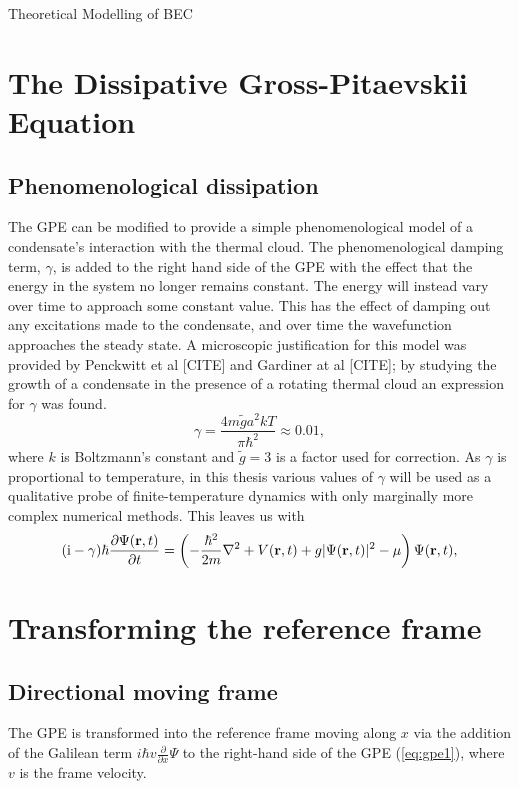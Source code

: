 \begin{chapter}{\label{cha:theoretical_model}Theoretical Modelling of BEC}
\section{\label{section:dgpe} The Dissipative Gross-Pitaevskii Equation}
	\subsection{\label{section:gamma} Phenomenological dissipation}
	The GPE can be modified to provide a simple phenomenological model of a condensate's interaction with the thermal cloud. The phenomenological damping term, $\gamma$, is added to the right hand side of the GPE with the effect that the energy in the system no longer remains constant. The energy will instead vary over time to approach some constant value. This has the effect of damping out any excitations made to the condensate, and over time the wavefunction approaches the steady state. A microscopic justification for this model was provided by Penckwitt et al [CITE] and Gardiner at al [CITE]; by studying the growth of a condensate in the presence of a rotating thermal cloud an expression for $\gamma$ was found.
		\begin{equation}\label{eq:dissgamma}
		\gamma = \frac{4m\tilde{g}a^2kT}{\pi\hbar^2} \approx 0.01,
		\end{equation}
	where $k$ is Boltzmann's constant and $\tilde{g} = 3$ is a factor used for correction. As $\gamma$ is proportional to temperature, in this thesis various values of $\gamma$ will be used as a qualitative probe of finite-temperature dynamics with only marginally more complex numerical methods. This leaves us with
		\begin{equation}\label{eq:dissgpe}
		(\mathrm{i}-\gamma) \hbar \frac{\partial\Psi({\bf r},t)}{\partial t} = \left(-\frac{\hbar^2}{2m}\nabla^2 + V({\bf r},t) + g|\Psi({\bf r},t)|^2 - \mu \right) \Psi({\bf r},t),
		\end{equation}

\section{\label{section:movframe} Transforming the reference frame}
	\subsection{\label{section:linearmovframe} Directional moving frame}
	The GPE is transformed into the reference frame moving along $x$ via the addition of the Galilean term $ i\hbar v\frac{\partial}{\partial x} \Psi$ to the right-hand side of the GPE (\ref{eq:gpe1}), where $v$ is the frame velocity. 

\end{chapter}
